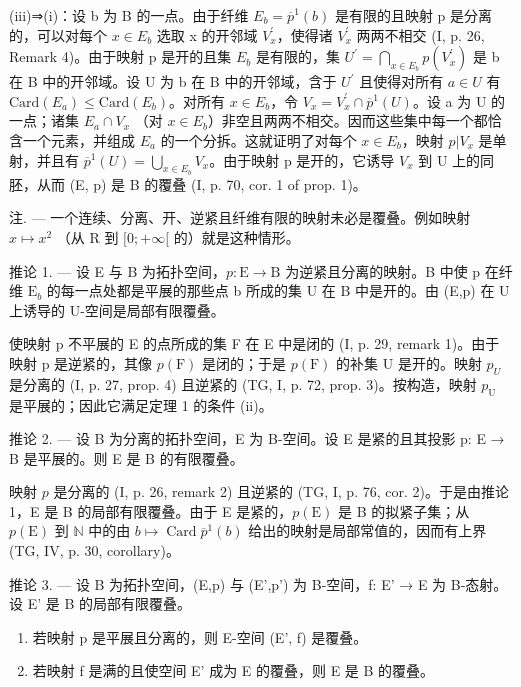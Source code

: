 (iii)⇒(i)：设 b 为 B 的一点。由于纤维 \(E_{b} = \overline{p}^{1}(b)\) 是有限的且映射 p 是分离的，可以对每个 \(x \in E_{b}\) 选取 x 的开邻域 \(V_{x}^{\prime}\)，使得诸 \(V_{x}^{\prime}\) 两两不相交 (I, p. 26, Remark 4)。由于映射 p 是开的且集 \(E_{b}\) 是有限的，集 \(U^{\prime} = \bigcap_{x \in E_{b}} p(V_{x}^{\prime})\) 是 b 在 B 中的开邻域。设 U 为 b 在 B 中的开邻域，含于 \(U^{\prime}\) 且使得对所有 \(a \in U\) 有 \(\text{Card}(E_{a}) \leqslant \text{Card}(E_{b})\)。对所有 \(x \in E_{b}\)，令 \(V_{x} = V_{x}^{\prime} \cap \overline{p}^{1}(U)\)。设 a 为 U 的一点；诸集 \(E_{a} \cap V_{x}\) （对 \(x \in E_{b}\)）非空且两两不相交。因而这些集中每一个都恰含一个元素，并组成 \(E_{a}\) 的一个分拆。这就证明了对每个 \(x \in E_{b}\)，映射 \(p | V_{x}\) 是单射，并且有 \(\overline{p}^{1}(U) = \bigcup_{x \in E_{b}} V_{x}\)。由于映射 p 是开的，它诱导 \(V_{x}\) 到 U 上的同胚，从而 (E, p) 是 B 的覆叠 (I, p. 70, cor. 1 of prop. 1)。

注. --- 一个连续、分离、开、逆紧且纤维有限的映射未必是覆叠。例如映射 \(x \mapsto x^{2}\) （从 R 到 \([0; +\infty[\) 的）就是这种情形。

推论 1. --- 设 E 与 B 为拓扑空间，\(p\colon\mathrm{E}\to\mathrm{B}\) 为逆紧且分离的映射。B 中使 p 在纤维 \(\mathrm{E}_{b}\) 的每一点处都是平展的那些点 b 所成的集 U 在 B 中是开的。由 (E,p) 在 U 上诱导的 U-空间是局部有限覆叠。

使映射 p 不平展的 E 的点所成的集 F 在 E 中是闭的 (I, p. 29, remark 1)。由于映射 p 是逆紧的，其像 \(p(\mathrm{F})\) 是闭的；于是 \(p(\mathrm{F})\) 的补集 U 是开的。映射 \(p_{U}\) 是分离的 (I, p. 27, prop. 4) 且逆紧的 (TG, I, p. 72, prop. 3)。按构造，映射 \(p_{\mathrm{U}}\) 是平展的；因此它满足定理 1 的条件 (ii)。

推论 2. — 设 B 为分离的拓扑空间，E 为 B-空间。设 E 是紧的且其投影 p: E → B 是平展的。则 E 是 B 的有限覆叠。

映射 \(p\) 是分离的 (I, p. 26, remark 2) 且逆紧的 (TG, I, p. 76, cor. 2)。于是由推论 1，E 是 B 的局部有限覆叠。由于 E 是紧的，\(p(\mathrm{E})\) 是 B 的拟紧子集；从 \(p(\mathrm{E})\) 到 \(\mathbb{N}\) 中的由 \(b \mapsto \operatorname{Card} \overline{p}^1(b)\) 给出的映射是局部常值的，因而有上界 (TG, IV, p. 30, corollary)。

推论 3. --- 设 B 为拓扑空间，(E,p) 与 (E',p') 为 B-空间，f: E' → E 为 B-态射。设 E' 是 B 的局部有限覆叠。

\begin{enumerate}
\def\labelenumi{\alph{enumi})}
\item
  若映射 p 是平展且分离的，则 E-空间 (E', f) 是覆叠。
\item
  若映射 f 是满的且使空间 E' 成为 E 的覆叠，则 E 是 B 的覆叠。
\end{enumerate}

